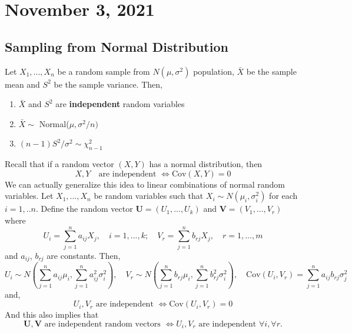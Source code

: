 \section{November 3, 2021}
\subsection{Sampling from Normal Distribution}
\begin{proposition}
    Let $X_1,...,X_n$ be a random sample from $N(\mu,\sigma^2)$ population, $\bar{X}$ be the sample mean and $S^2$ be the sample variance. Then, 
    \begin{enumerate}
        \item $\bar{X}$ and $S^2$ are \textbf{independent} random variables
        \item $\bar{X} \sim$ Normal($\mu,\sigma^2/n)$
        \item $(n-1)S^2/\sigma^2 \sim \chi_{n-1}^2$
    \end{enumerate}
\end{proposition}
Recall that if a random vector $(X,Y)$ has a normal distribution, then
$$
X,Y \quad \text{are independent } \iff \text{Cov}(X,Y) = 0
$$
We can actually generalize this idea to linear combinations of normal random variables. Let $X_1,...,X_n$ be random variables such that $X_i \sim N(\mu_i, \sigma_i^2)$ for each $i=1,..n$. Define the random vector $\boldsymbol{U} =(U_1,...,U_k)$ and $\boldsymbol{V} = (V_1,...,V_r)$ where
$$
U_i = \sum_{j=1}^n a_{ij}X_j, \quad i=1,...,k; \quad V_r = \sum_{j=1}^{n}b_{rj}X_j, \quad r=1,...,m
$$
and $ a_{ij}$, $b_{rj}$ are constants. Then,
$$
U_i \sim N \left( \sum_{j=1}^n a_{ij} \mu_i, \sum_{j=1}^n a_{ij}^2 \sigma_i^2 \right),
\quad
V_r \sim N \left( \sum_{j=1}^n b_{rj} \mu_i, \sum_{j=1}^n b_{rj}^2 \sigma_i^2 \right),
\quad
\text{Cov}(U_i,V_r) = \sum_{j=1}^n a_{ij} b_{rj} \sigma_j^2
$$
and, 
$$
U_i,V_r \text{ are independent } \iff \text{Cov}(U_i,V_r) = 0
$$
And this also implies that
$$
\boldsymbol{U},\boldsymbol{V} \text{ are independent random vectors } \iff U_i, V_r \text{ are independent } \forall i, \forall r.
$$